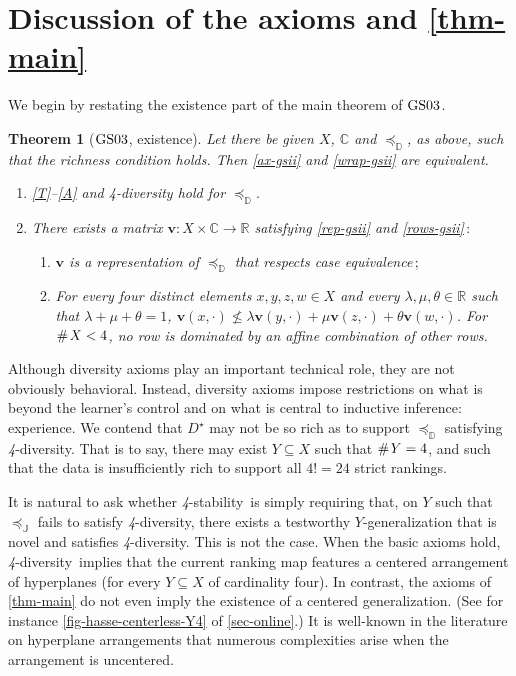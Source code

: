 \documentclass[ecta,nameyear,draft]{econsocart}
\newcommand{\countof}{\mathbin{\#}\hskip1pt}
\newcommand{\R}{\mathbb R}
\newcommand{\preceqb}{\mathbin{\preceq}}
\newcommand{\mbbd}{{\mathds D}}
\newcommand{\mbbc}{{\mathds C}}
\newcommand{\mbbj}{\mathds J}
\newcommand{\past}{{D^\star}}
\newcommand{\stability}{\textit{4}-\textup{{stability}}}
\newcommand{\fourdiv}{\textit{4}-\textup{diversity}}
\newcommand{\gsii}{$\textup{GS03}$}
\theoremstyle{plain}
\newtheorem*{theorem*}{Theorem}
\theoremstyle{remark}
\begin{document}
\section{Discussion of the axioms and \cref{thm-main}}\label{sec-discussion}
We begin by restating the existence part of the main theorem of \gsii.
\begin{theorem*}[\gsii, existence]\label{thm-gsii} Let there be given $X$,
  $\mbbc$ and $\preceqb_ \mbbd$, as above, such that the richness condition
  holds. Then \ref{ax-gsii} and \ref{wrap-gsii} are equivalent.
  \begin{enumerate}[label=\textup{(\roman*)}]
    \item\label{ax-gsii} \textup{\ref{T}--\ref{A}} and \textup{\fourdiv} hold
      for $\preceq_{\mbbd}$.
    \item\label{wrap-gsii} There exists a matrix $\mathbf{v} : X \times \mbbc
      \rightarrow \R$ satisfying \ref{rep-gsii} and \ref{rows-gsii}$\,:$
      \begin{enumerate}[label=\textup{(\alph*)}]
        \item\label{rep-gsii} $\mathbf{v}$ is a representation of
          $\preceq_{\mbbd}$ that respects case equivalence$\,;$
        \item\label{rows-gsii} For every four distinct elements $x,y,z,w \in X$
          and every $\lambda , \mu, \theta \in \R$ such that $\lambda +\mu +
          \theta = 1$, $\mathbf{v}(x,\cdot ) \not \leq \lambda
          \mathbf{v}(y,\cdot
          )+\mu
          \mathbf{v}(z,\cdot)+ \theta \mathbf{v}(w,\cdot)$.  For $\countof X <
          4$, no row is dominated by an affine combination of other rows.
      \end{enumerate} 
  \end{enumerate}
\end{theorem*}

Although diversity axioms play an important technical role, they are not
obviously behavioral. Instead, diversity axioms impose restrictions on what is
beyond the learner's control and on what is central to inductive inference:
experience. We contend that $\past$ may not be so rich as to support
$\preceqb_{\mbbd}$ satisfying \fourdiv. That is to say, there may exist $Y
\subseteq X$ such that $\countof Y = 4$, and such that the data is
insufficiently rich to support all $4 ! = 24$ strict rankings.

It is natural to ask whether \stability\ is simply requiring that, on $Y$ such
that $\preceq_{\mbbj}$ fails to satisfy \fourdiv, there exists a testworthy
$Y$-generalization that is novel and satisfies \fourdiv.  This is not the
case.  When the basic axioms hold, \fourdiv\ implies that the current ranking
map features a centered arrangement of hyperplanes (for every $Y\subseteq X$ of
cardinality four). In contrast, the axioms of \cref{thm-main} do not even imply
the existence of a centered generalization.  (See for instance
\cref{fig-hasse-centerless-Y4} of \cref{sec-online}.) It is well-known in the
literature on hyperplane arrangements that numerous complexities arise when the
arrangement is uncentered.
\end{document}
